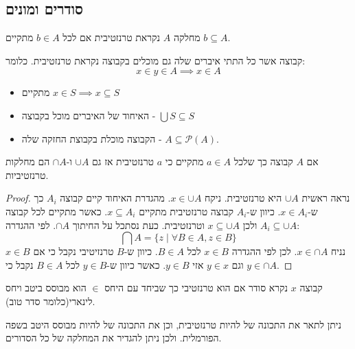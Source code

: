 \documentclass{tstextbook}
\begin{document}
\subsection{סודרים ומונים}

\begin{definition}
מחלקה \(A\) נקראת טרנזטיבית אם לכל \(b \in A\) מתקיים \(b \subseteq A\).

\end{definition}
\begin{definition}
קבוצה אשר כל התתי איברים שלה גם מוכלים בקבוצה נקראת טרנזטיבית. כלומר:
$$x\in y\in A\implies x\in A$$

\end{definition}
\begin{proposition}
  \begin{itemize}
    \item מתקיים \(x \in S\implies x\subseteq S\)
    \item האיחוד של האיברים מוכל בקבוצה - \(\bigcup S\subseteq S\)
    \item הקבוצה מוכלת בקבוצת החזקה שלה - \(A\subseteq \mathcal{P}(A)\).
  \end{itemize}
\end{proposition}
\begin{proposition}
אם \(A\) קבוצה כך שלכל \(a \in A\) מתקיים כי \(a\) טרנזטיבית אז גם \(\cup A\) ו-\(\cap A\) הם מחלקות טרנזטיביות.

\end{proposition}
\begin{proof}
נראה ראשית \(\cup A\) היא טרנזטיבית. ניקח \(x \in \cup A\). מהגדרת האיחוד קיים קבוצה \(A_{i}\) כך ש-\(x \in A_{i}\). כיוון ש-\(A_{i}\) קבוצה טרנזטיבית מתקיים \(x \subseteq A_{i}\). כאשר מתקיים לכל קבוצה \(A_{i}\subseteq \cup A\) ולכן \(x\subseteq \cup A\) וטרנזטיבית.
כעת נסתכל על החיתוך \(\cap A\). לפי ההגדרה:
$$\bigcap A=\{z\mid\forall B\in A,z\in B\}$$
נניח \(x \in \cap A\). לכן לפי ההגדרה \(x \in B\)  לכל \(B \in A\). כיוון ש-\(B\) טרנזיטיבי נקבל כי אם \(x \in B\) וגם \(y \in x\) אזי \(y \in B\). כאשר כיוון ש-\(y \in B\) לכל \(B \in A\) נקבל כי \(y \in \cap A\).

\end{proof}
\begin{definition}[סודר]
קבוצה \(x\) נקרא סודר אם הוא טרנזטיבי כך שביחד עם היחס \(\in\) הוא מבוסס ביטב ויחס לינארי(כלומר סדר טוב). 

\end{definition}
\begin{remark}
ניתן לתאר את התכונה של להיות טרנזטיבית, וכן את התכונה של להיות מבוסס היטב בשפה הפורמלית. ולכן ניתן להגדיר את המחלקה של כל הסדורים.

\end{remark}
\end{document}
